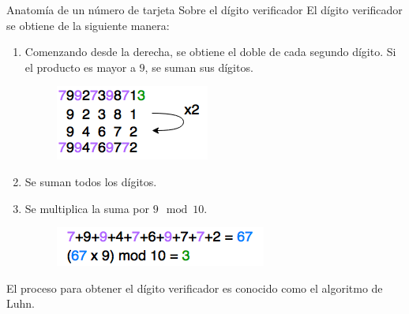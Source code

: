 \begin{frame}{Anatomía de un número de tarjeta}
  {Sobre el dígito verificador}
  El dígito verificador se obtiene de la siguiente manera:
  \begin{enumerate}
    \item Comenzando desde la derecha, se obtiene el doble de cada segundo
      dígito. Si el producto es mayor a $9$, se suman sus dígitos.
      \begin{figure}[H]
        \begin{center}
          \includegraphics[width=0.3\linewidth]{diagramas/luhn_1.png}
        \end{center}
      \end{figure}
    \item Se suman todos los dígitos.
    \item Se multiplica la suma por $9 \mod  10$.
      \begin{figure}[H]
        \begin{center}
          \includegraphics[width=0.5\linewidth]{diagramas/luhn_2.png}
        \end{center}
      \end{figure}
  \end{enumerate}
  El proceso para obtener el dígito verificador es conocido como el algoritmo de
  Luhn.
\end{frame}
